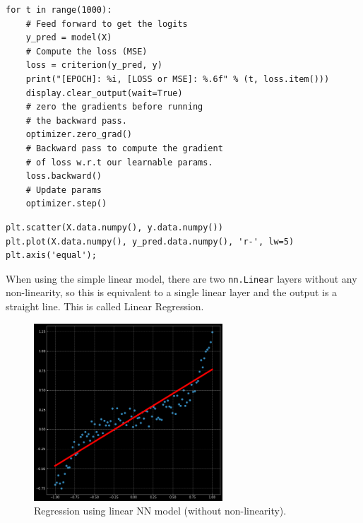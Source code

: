         \begin{verbatim}
for t in range(1000):    
    # Feed forward to get the logits
    y_pred = model(X)    
    # Compute the loss (MSE)
    loss = criterion(y_pred, y)
    print("[EPOCH]: %i, [LOSS or MSE]: %.6f" % (t, loss.item()))
    display.clear_output(wait=True)    
    # zero the gradients before running
    # the backward pass.
    optimizer.zero_grad()
    # Backward pass to compute the gradient
    # of loss w.r.t our learnable params. 
    loss.backward()    
    # Update params
    optimizer.step()
        \end{verbatim}
        \begin{verbatim}
plt.scatter(X.data.numpy(), y.data.numpy())
plt.plot(X.data.numpy(), y_pred.data.numpy(), 'r-', lw=5)
plt.axis('equal');        
        \end{verbatim}
        When using the simple linear model, there are two \texttt{nn.Linear} layers without any non-linearity, so this is equivalent to a single linear layer and the output is a straight line. This is called Linear Regression.
    
        \begin{figure}[H]
        \begin{center}
        \includegraphics[width=200pt]{labs/03/images/05-first_reg.png}
        \end{center} 
        \caption{Regression using linear NN model (without non-linearity).}
        \end{figure}
        
